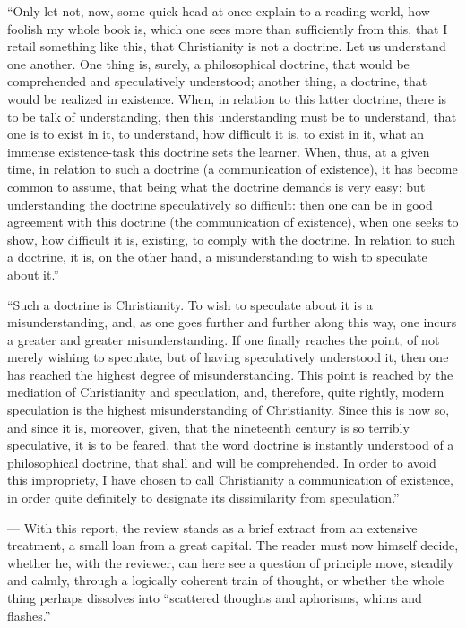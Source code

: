 \documentclass[12pt]{book}
\begin{document}
``Only let not, now, some quick head at once explain to a reading world, how foolish my whole book is, which one sees more than sufficiently from this, that I retail something like this, that Christianity is not a doctrine. Let us understand one another. One thing is, surely, a philosophical doctrine, that would be comprehended and speculatively understood; another thing, a doctrine, that would be realized in existence. When, in relation to this latter doctrine, there is to be talk of understanding, then this understanding must be to understand, that one is to exist in it, to understand, how difficult it
is, to exist in it, what an immense existence-task this doctrine sets the learner. When, thus, at a given time, in relation to such a doctrine (a communication of existence), it has become common to assume, that being what the doctrine demands is very easy; but understanding the doctrine speculatively so difficult: then one can be in good agreement with this doctrine (the communication of existence), when one seeks to show, how difficult it is, existing, to comply with the doctrine. In relation to such a doctrine, it is, on the other hand, a misunderstanding to wish to speculate about it.''

``Such a doctrine is Christianity. To wish to speculate about it is a misunderstanding, and, as one goes further and further along this way, one incurs a greater and greater misunderstanding. If one finally reaches the point, of not merely wishing to speculate, but of having speculatively understood it, then one has reached the highest degree of misunderstanding. This point is reached by the mediation of Christianity and speculation, and, therefore, quite rightly, modern speculation is the highest misunderstanding of Christianity. Since this is now so, and since it is, moreover, given, that the nineteenth century is so terribly speculative, it is to be feared, that the word doctrine is instantly understood of a philosophical doctrine, that shall and will be comprehended. In order to avoid this impropriety, I have chosen to call Christianity a communication of existence, in order quite definitely to designate its dissimilarity from speculation.''

--- With this report, the review stands as a brief extract from an extensive treatment, a small loan from a great capital. The reader must now himself decide, whether he, with the reviewer, can here see a question of principle move, steadily and calmly, through a logically coherent train of thought, or whether the whole thing perhaps dissolves into ``scattered thoughts and aphorisms, whims and flashes.''
\end{document}
